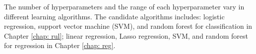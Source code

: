 The number of hyperparameters and the range of each hyperparameter vary in different learning algorithms. The candidate algorithms includes: logistic regression, support vector machine (SVM), and random forest for classification in Chapter \ref{chap: rul}; linear regression, Lasso regression, SVM, and random forest for regression in Chapter \ref{chap: reg}.